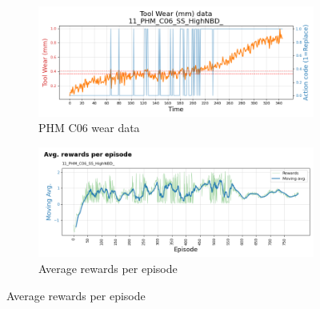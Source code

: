 \documentclass[a4paper, 12pt]{article}
\begin{document}
\begin{figure}[ht]
	\begin{subfigure}[b]{0.5\textwidth}
		\centering
		\includegraphics[width=\textwidth]{images/TrainingPlots/11_PHM_C06_SS_HighNBD__wear_plot.png}  
		\caption{PHM C06 wear data}
		\label{fig:C06wear}
	\end{subfigure}
	\hfill
	\begin{subfigure}[b]{0.5\textwidth}
		\centering
		\includegraphics[width=\textwidth]{images/TrainingPlots/11_PHM_C06_SS_HighNBD__Avg_episode_rewards.png}  
		\caption{Average rewards per episode}
		\label{fig:C06rewards}
	\end{subfigure} \par\bigskip
	

\end{figure}
\end{document}
